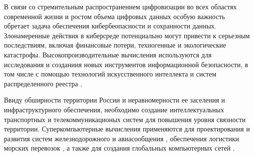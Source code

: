 \documentclass[a4paper,14pt]{extarticle}                     %
\numberwithin{equation}{section}                             %
\numberwithin{figure}{section}                               %
\numberwithin{table}{section}                                %
\theoremstyle{plain}                                         %
\numberwithin{theorem}{section}                              %
\numberwithin{lemma}{section}                                %
\numberwithin{definition}{section}                           %
\begin{document}
В связи со стремительным распространением цифровизации во всех областях современной жизни и ростом объема цифровых данных особую важность обретает задача обеспечения кибербеопасности и сохранности данных.
Злонамеренные действия в киберсреде потенциально могут привести к серьезным последствиям, включая финансовые потери, техногенные и экологические катастрофы.
Высокопроизводительные вычисления используются для исследования и созданиия новых инструментов информационной безопасности, в том числе с помощью технологий искусственного интеллекта и систем распределенного реестра \cite{Terziyska2024SuperCyber}.

Ввиду обширности территории России и неравномерности ее заселения и инфраструктурного обеспечения, необходимо создание интеллектуальных транспортных и телекоммуникационых систем для повышения уровня связности территории.
Суперкомпьютерные вычисления применяются для проектирования и развития систем железнодорожного и авиасообщения \cite{Juntana2022SuperFlight}, обеспечения логистики морских перевозок \cite{Yan2024SuperSea}, а также для создания глобальных компьютерных сетей \cite{Abramov2025SuperNets}.

\end{document}
